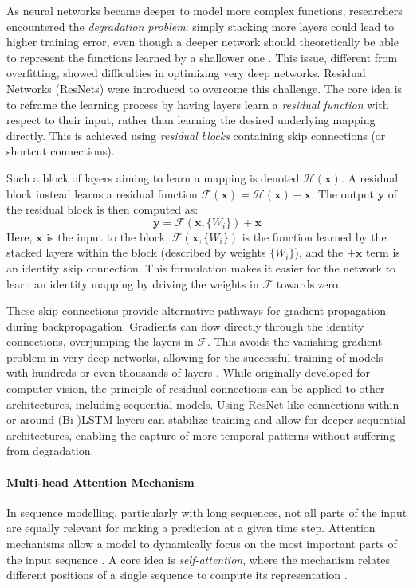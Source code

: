 As neural networks became deeper to model more complex functions, researchers encountered the \textit{degradation problem}: simply stacking more layers could lead to higher training error, even though a deeper network should theoretically be able to represent the functions learned by a shallower one \autocite{he2016deep}. This issue, different from overfitting, showed difficulties in optimizing very deep networks. Residual Networks (ResNets) were introduced to overcome this challenge. The core idea is to reframe the learning process by having layers learn a \textit{residual function} with respect to their input, rather than learning the desired underlying mapping directly. This is achieved using \textit{residual blocks} containing skip connections (or shortcut connections).

Such a block of layers aiming to learn a mapping is denoted \( \mathcal{H}(\bm{x}) \). A residual block instead learns a residual function \( \mathcal{F}(\bm{x}) = \mathcal{H}(\bm{x}) - \bm{x} \). The output \( \bm{y} \) of the residual block is then computed as:
\begin{equation}
    \bm{y} = \mathcal{F}(\bm{x}, \{W_i\}) + \bm{x}
    \label{eq:resnet_block}
\end{equation}
Here, \( \bm{x} \) is the input to the block, \( \mathcal{F}(\bm{x}, \{W_i\}) \) is the function learned by the stacked layers within the block (described by weights \( \{W_i\} \)), and the \( +\bm{x} \) term is an identity skip connection. This formulation makes it easier for the network to learn an identity mapping by driving the weights in \( \mathcal{F} \) towards zero.

These skip connections provide alternative pathways for gradient propagation during backpropagation. Gradients can flow directly through the identity connections, overjumping the layers in \( \mathcal{F} \). This avoids the vanishing gradient problem in very deep networks, allowing for the successful training of models with hundreds or even thousands of layers \autocite{he2016deep}. While originally developed for computer vision, the principle of residual connections can be applied to other architectures, including sequential models. Using ResNet-like connections within or around (Bi-)LSTM layers can stabilize training and allow for deeper sequential architectures, enabling the capture of more  temporal patterns without suffering from degradation.

\paragraph{\textbf{Multi-head Attention Mechanism}}
\label{sec:attention}
In sequence modelling, particularly with long sequences, not all parts of the input are equally relevant for making a prediction at a given time step. Attention mechanisms allow a model to dynamically focus on the most important parts of the input sequence \autocite{chorowski2014end}. A core idea is \textit{self-attention}, where the mechanism relates different positions of a single sequence to compute its representation \autocite{vaswani2017attention}.

